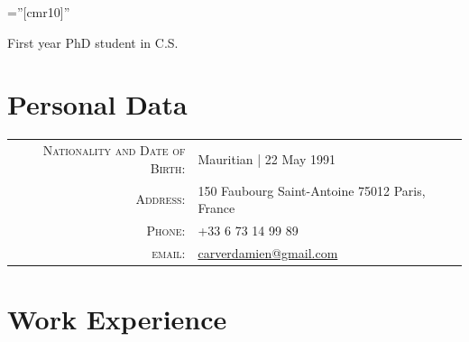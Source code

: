 \documentclass[a4paper,10pt]{article} %
\begin{document}
\pagestyle{empty} %

\font\fb=''[cmr10]'' %


\par{\bigskip\par}
\par{\centering \footnotesize First year PhD student in C.S. \par}

\section{Personal Data}

\begin{tabular}{rl}
	\textsc{Nationality and Date of Birth:} & Mauritian  | 22 May 1991 \\
	\textsc{Address:} & 150 Faubourg Saint-Antoine 75012 Paris, France\\
	\textsc{Phone:} & +33 6 73 14 99 89\\
	\textsc{email:} & \href{carverdamien@gmail.com}{carverdamien@gmail.com}
\end{tabular}


\section{Work Experience}
\end{document}
